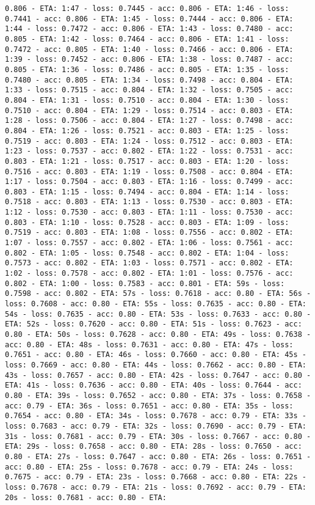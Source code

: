 \documentclass[11pt]{article}
\begin{document}
\begin{Verbatim}[commandchars=\\\{\}]
0.806 - ETA: 1:47 - loss: 0.7445 - acc: 0.806 - ETA: 1:46 - loss: 0.7441 - acc: 0.806 - ETA: 1:45 - loss: 0.7444 - acc: 0.806 - ETA: 1:44 - loss: 0.7472 - acc: 0.806 - ETA: 1:43 - loss: 0.7480 - acc: 0.805 - ETA: 1:42 - loss: 0.7464 - acc: 0.806 - ETA: 1:41 - loss: 0.7472 - acc: 0.805 - ETA: 1:40 - loss: 0.7466 - acc: 0.806 - ETA: 1:39 - loss: 0.7452 - acc: 0.806 - ETA: 1:38 - loss: 0.7487 - acc: 0.805 - ETA: 1:36 - loss: 0.7486 - acc: 0.805 - ETA: 1:35 - loss: 0.7480 - acc: 0.805 - ETA: 1:34 - loss: 0.7498 - acc: 0.804 - ETA: 1:33 - loss: 0.7515 - acc: 0.804 - ETA: 1:32 - loss: 0.7505 - acc: 0.804 - ETA: 1:31 - loss: 0.7510 - acc: 0.804 - ETA: 1:30 - loss: 0.7510 - acc: 0.804 - ETA: 1:29 - loss: 0.7514 - acc: 0.803 - ETA: 1:28 - loss: 0.7506 - acc: 0.804 - ETA: 1:27 - loss: 0.7498 - acc: 0.804 - ETA: 1:26 - loss: 0.7521 - acc: 0.803 - ETA: 1:25 - loss: 0.7519 - acc: 0.803 - ETA: 1:24 - loss: 0.7512 - acc: 0.803 - ETA: 1:23 - loss: 0.7537 - acc: 0.802 - ETA: 1:22 - loss: 0.7531 - acc: 0.803 - ETA: 1:21 - loss: 0.7517 - acc: 0.803 - ETA: 1:20 - loss: 0.7516 - acc: 0.803 - ETA: 1:19 - loss: 0.7508 - acc: 0.804 - ETA: 1:17 - loss: 0.7504 - acc: 0.803 - ETA: 1:16 - loss: 0.7499 - acc: 0.803 - ETA: 1:15 - loss: 0.7494 - acc: 0.804 - ETA: 1:14 - loss: 0.7518 - acc: 0.803 - ETA: 1:13 - loss: 0.7530 - acc: 0.803 - ETA: 1:12 - loss: 0.7530 - acc: 0.803 - ETA: 1:11 - loss: 0.7530 - acc: 0.803 - ETA: 1:10 - loss: 0.7528 - acc: 0.803 - ETA: 1:09 - loss: 0.7519 - acc: 0.803 - ETA: 1:08 - loss: 0.7556 - acc: 0.802 - ETA: 1:07 - loss: 0.7557 - acc: 0.802 - ETA: 1:06 - loss: 0.7561 - acc: 0.802 - ETA: 1:05 - loss: 0.7548 - acc: 0.802 - ETA: 1:04 - loss: 0.7573 - acc: 0.802 - ETA: 1:03 - loss: 0.7571 - acc: 0.802 - ETA: 1:02 - loss: 0.7578 - acc: 0.802 - ETA: 1:01 - loss: 0.7576 - acc: 0.802 - ETA: 1:00 - loss: 0.7583 - acc: 0.801 - ETA: 59s - loss: 0.7598 - acc: 0.802 - ETA: 57s - loss: 0.7618 - acc: 0.80 - ETA: 56s - loss: 0.7608 - acc: 0.80 - ETA: 55s - loss: 0.7635 - acc: 0.80 - ETA: 54s - loss: 0.7635 - acc: 0.80 - ETA: 53s - loss: 0.7633 - acc: 0.80 - ETA: 52s - loss: 0.7620 - acc: 0.80 - ETA: 51s - loss: 0.7623 - acc: 0.80 - ETA: 50s - loss: 0.7628 - acc: 0.80 - ETA: 49s - loss: 0.7638 - acc: 0.80 - ETA: 48s - loss: 0.7631 - acc: 0.80 - ETA: 47s - loss: 0.7651 - acc: 0.80 - ETA: 46s - loss: 0.7660 - acc: 0.80 - ETA: 45s - loss: 0.7669 - acc: 0.80 - ETA: 44s - loss: 0.7662 - acc: 0.80 - ETA: 43s - loss: 0.7657 - acc: 0.80 - ETA: 42s - loss: 0.7647 - acc: 0.80 - ETA: 41s - loss: 0.7636 - acc: 0.80 - ETA: 40s - loss: 0.7644 - acc: 0.80 - ETA: 39s - loss: 0.7652 - acc: 0.80 - ETA: 37s - loss: 0.7658 - acc: 0.79 - ETA: 36s - loss: 0.7651 - acc: 0.80 - ETA: 35s - loss: 0.7654 - acc: 0.80 - ETA: 34s - loss: 0.7678 - acc: 0.79 - ETA: 33s - loss: 0.7683 - acc: 0.79 - ETA: 32s - loss: 0.7690 - acc: 0.79 - ETA: 31s - loss: 0.7681 - acc: 0.79 - ETA: 30s - loss: 0.7667 - acc: 0.80 - ETA: 29s - loss: 0.7658 - acc: 0.80 - ETA: 28s - loss: 0.7650 - acc: 0.80 - ETA: 27s - loss: 0.7647 - acc: 0.80 - ETA: 26s - loss: 0.7651 - acc: 0.80 - ETA: 25s - loss: 0.7678 - acc: 0.79 - ETA: 24s - loss: 0.7675 - acc: 0.79 - ETA: 23s - loss: 0.7668 - acc: 0.80 - ETA: 22s - loss: 0.7678 - acc: 0.79 - ETA: 21s - loss: 0.7692 - acc: 0.79 - ETA: 20s - loss: 0.7681 - acc: 0.80 - ETA: 
\end{Verbatim}
\end{document}
